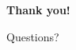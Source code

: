 \documentclass[aspectratio=169]{beamer}
\begin{document}
  

\begin{frame}[c]
\centering
\Huge
\textbf{Thank you!}

\vspace{1cm}

\LARGE
Questions?
\end{frame}

\end{document}
